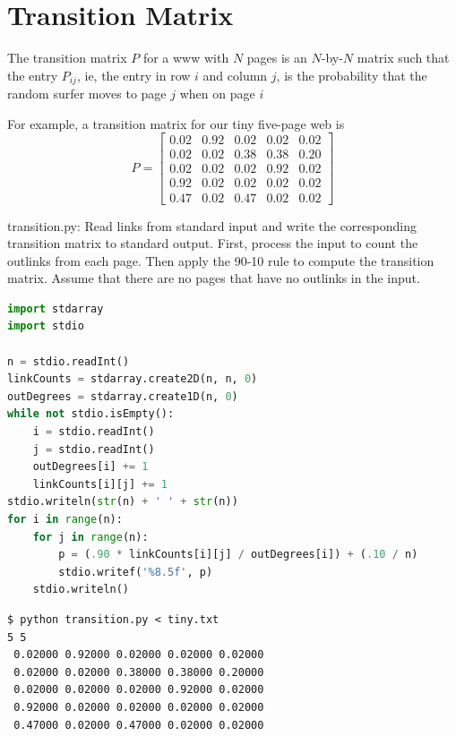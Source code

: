 \documentclass[8pt,a4paper,compress]{beamer}
\begin{document}
\section{Transition Matrix}
\begin{frame}[fragile]
\pause

The transition matrix $P$ for a www with $N$ pages is an $N$-by-$N$ matrix such that the entry $P_{ij}$, ie, the entry in row $i$ and column $j$, is the probability that the random surfer moves to page $j$ when on page $i$

\pause
\bigskip

For example, a transition matrix for our tiny five-page web is
\[
P = \begin{bmatrix}
0.02 & 0.92 & 0.02 & 0.02 & 0.02 \\
0.02 & 0.02 & 0.38 & 0.38 & 0.20 \\
0.02 & 0.02 & 0.02 & 0.92 & 0.02 \\
0.92 & 0.02 & 0.02 & 0.02 & 0.02 \\
0.47 & 0.02 & 0.47 & 0.02 & 0.02
\end{bmatrix}
\]
\end{frame}
\begin{frame}[fragile]
\pause

\begin{framed}
\tiny transition.py: Read links from standard input and write the corresponding transition matrix to standard output. First, process the input to count the outlinks from each page. Then apply the 90-10 rule to compute the transition matrix. Assume that there are no pages that have no outlinks in the input.
\end{framed}

\begin{lstlisting}[language=Python]
import stdarray
import stdio

n = stdio.readInt()
linkCounts = stdarray.create2D(n, n, 0)
outDegrees = stdarray.create1D(n, 0)
while not stdio.isEmpty():
    i = stdio.readInt()
    j = stdio.readInt()
    outDegrees[i] += 1
    linkCounts[i][j] += 1
stdio.writeln(str(n) + ' ' + str(n))
for i in range(n):
    for j in range(n):
        p = (.90 * linkCounts[i][j] / outDegrees[i]) + (.10 / n)
        stdio.writef('%8.5f', p)
    stdio.writeln()
\end{lstlisting}

\pause

\begin{lstlisting}[language={}]
$ python transition.py < tiny.txt
5 5
 0.02000 0.92000 0.02000 0.02000 0.02000
 0.02000 0.02000 0.38000 0.38000 0.20000
 0.02000 0.02000 0.02000 0.92000 0.02000
 0.92000 0.02000 0.02000 0.02000 0.02000
 0.47000 0.02000 0.47000 0.02000 0.02000
\end{lstlisting}
\end{frame}
\end{document}
